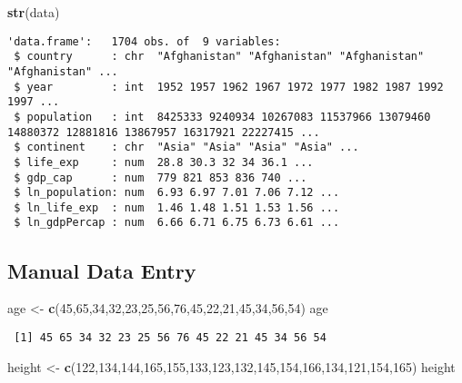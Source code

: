 \documentclass[
]{article}
\newenvironment{Shaded}{\begin{snugshade}}{\end{snugshade}}
\newcommand{\DecValTok}[1]{\textcolor[rgb]{0.00,0.00,0.81}{#1}}
\newcommand{\FunctionTok}[1]{\textcolor[rgb]{0.13,0.29,0.53}{\textbf{#1}}}
\newcommand{\NormalTok}[1]{#1}
\newcommand{\OtherTok}[1]{\textcolor[rgb]{0.56,0.35,0.01}{#1}}
\begin{document}
\begin{Shaded}
\begin{Highlighting}[]
\FunctionTok{str}\NormalTok{(data)}
\end{Highlighting}
\end{Shaded}

\begin{verbatim}
'data.frame':   1704 obs. of  9 variables:
 $ country      : chr  "Afghanistan" "Afghanistan" "Afghanistan" "Afghanistan" ...
 $ year         : int  1952 1957 1962 1967 1972 1977 1982 1987 1992 1997 ...
 $ population   : int  8425333 9240934 10267083 11537966 13079460 14880372 12881816 13867957 16317921 22227415 ...
 $ continent    : chr  "Asia" "Asia" "Asia" "Asia" ...
 $ life_exp     : num  28.8 30.3 32 34 36.1 ...
 $ gdp_cap      : num  779 821 853 836 740 ...
 $ ln_population: num  6.93 6.97 7.01 7.06 7.12 ...
 $ ln_life_exp  : num  1.46 1.48 1.51 1.53 1.56 ...
 $ ln_gdpPercap : num  6.66 6.71 6.75 6.73 6.61 ...
\end{verbatim}

\hypertarget{manual-data-entry}{%
\subsection{Manual Data Entry}\label{manual-data-entry}}

\begin{Shaded}
\begin{Highlighting}[]
\NormalTok{age }\OtherTok{\textless{}{-}} \FunctionTok{c}\NormalTok{(}\DecValTok{45}\NormalTok{,}\DecValTok{65}\NormalTok{,}\DecValTok{34}\NormalTok{,}\DecValTok{32}\NormalTok{,}\DecValTok{23}\NormalTok{,}\DecValTok{25}\NormalTok{,}\DecValTok{56}\NormalTok{,}\DecValTok{76}\NormalTok{,}\DecValTok{45}\NormalTok{,}\DecValTok{22}\NormalTok{,}\DecValTok{21}\NormalTok{,}\DecValTok{45}\NormalTok{,}\DecValTok{34}\NormalTok{,}\DecValTok{56}\NormalTok{,}\DecValTok{54}\NormalTok{)}
\NormalTok{age}
\end{Highlighting}
\end{Shaded}

\begin{verbatim}
 [1] 45 65 34 32 23 25 56 76 45 22 21 45 34 56 54
\end{verbatim}

\begin{Shaded}
\begin{Highlighting}[]
\NormalTok{height }\OtherTok{\textless{}{-}} \FunctionTok{c}\NormalTok{(}\DecValTok{122}\NormalTok{,}\DecValTok{134}\NormalTok{,}\DecValTok{144}\NormalTok{,}\DecValTok{165}\NormalTok{,}\DecValTok{155}\NormalTok{,}\DecValTok{133}\NormalTok{,}\DecValTok{123}\NormalTok{,}\DecValTok{132}\NormalTok{,}\DecValTok{145}\NormalTok{,}\DecValTok{154}\NormalTok{,}\DecValTok{166}\NormalTok{,}\DecValTok{134}\NormalTok{,}\DecValTok{121}\NormalTok{,}\DecValTok{154}\NormalTok{,}\DecValTok{165}\NormalTok{)}
\NormalTok{height}
\end{Highlighting}
\end{Shaded}
\end{document}
